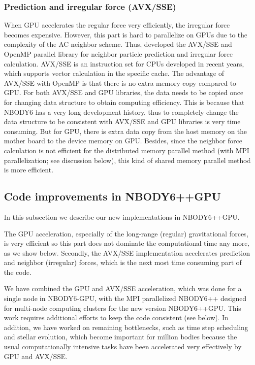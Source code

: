 \documentclass[usenatbib,aas_macros]{mn2e}
\def\nbody{NBODY6 }
\begin{document}
\subsubsection{Prediction and irregular force (AVX/SSE)}
When GPU accelerates the regular force very efficiently, the irregular force becomes expensive. 
However, this part is hard to parallelize on GPUs due to the complexity of the AC neighbor scheme. 
Thus, \cite{Nitadori2012} developed the AVX/SSE and OpenMP parallel library for neighbor particle prediction and irregular force calculation.
AVX/SSE is an instruction set for CPUs developed in recent years, which supports vector calculation in the specific cache. 
The advantage of AVX/SSE with OpenMP is that there is no extra memory copy compared to GPU.
For both AVX/SSE and GPU libraries, the data needs to be copied once for changing data structure to obtain computing efficiency.
This is because that \nbody has a very long development history, thus to completely change the data structure to be consistent with AVX/SSE and GPU libraries is very time consuming.
But for GPU, there is extra data copy from the host memory on the mother board to the device memory on GPU.
Besides, since the neighbor force calculation is not efficient for the distributed memory parallel method (with MPI parallelization; see discussion below), 
this kind of shared memory parallel method is more efficient.

\subsection{Code improvements in NBODY6++GPU}

In this subsection we describe our new implementations in NBODY6++GPU.

The GPU acceleration, especially of the long-range (regular) gravitational forces, is very efficient so this part does not dominate the computational time any more, as we show below. 
Secondly, the AVX/SSE implementation accelerates prediction and neighbor (irregular) forces, which is the next most time consuming part of the code. 

We have combined the GPU and AVX/SSE acceleration, which was done for a single node in NBODY6-GPU, with the MPI parallelized NBODY6++ designed for multi-node computing clusters for the new version NBODY6++GPU.
This work requires additional efforts to keep the code consistent (see below). 
In addition, we have worked on remaining bottlenecks, such as time step scheduling and stellar evolution, which become important for million bodies because the usual computationally intensive tasks have been accelerated very effectively by GPU and AVX/SSE.
\end{document}

